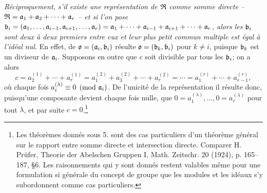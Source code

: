 \emph{Réciproquement, s'il existe une représentation de $\mathfrak{R}$ comme somme directe -- $\mathfrak{R}=\mathfrak{a}_1+\mathfrak{a}_2+\cdots+\mathfrak{a}_r$ -- et si l'on pose $\mathfrak{b}_i=(\mathfrak{a}_1,\ldots,\mathfrak{a}_{i-1},\mathfrak{a}_{i+1},\ldots,\mathfrak{a}_r)=\mathfrak{a}_1+\cdots+\mathfrak{a}_{i-1}+\mathfrak{a}_{i+1}+\cdots+\mathfrak{a}_r$, alors les $\mathfrak{b}_i$ sont deux à deux premiers entre eux et leur plus petit commun multiple est égal à l'idéal nul.} En effet, de $\mathfrak{o}=(\mathfrak{a}_i,\mathfrak{b}_i)$ résulte $\mathfrak{o}=(\mathfrak{b}_k,\mathfrak{b}_i)$ pour $k\ne i$, puisque $\mathfrak{b}_k$ est un diviseur de $\mathfrak{a}_i$. Supposons en outre que $c$ soit divisible par tous les $\mathfrak{b}_i$; on a alors
\[
 c=a_2^{(1)}+\cdots+a_r^{(1)}=a_1^{(2)}+a_3^{(2)}+\cdots+a_r^{(2)}=\cdots=a_1^{(r)}+\cdots+a_{r-1}^{(r)},
\]
où chaque fois $a_i^{(\lambda)}\equiv0\pmod{\mathfrak{a}_i}$. De l'unicité de la représentation il résulte donc, puisqu'une composante devient chaque fois nulle, que $0=a_1^{(\lambda)},\ldots,0=a_r^{(\lambda)}$ pour tout $\lambda$, et par suite $c=0$.\footnote{Les théorèmes donnés sous 5. sont des cas particuliers d'un théorème général sur le rapport entre somme directe et intersection directe. Comparer H. Prüfer, Theorie der Abelschen Gruppen I, Math. Zeitschr. 20 (1924), p. 165--187, \S{}6. Les raisonnements qui y sont donnés restent valables même pour une formulation si générale du concept de groupe que les modules et les idéaux s'y subordonnent comme cas particuliers.}
